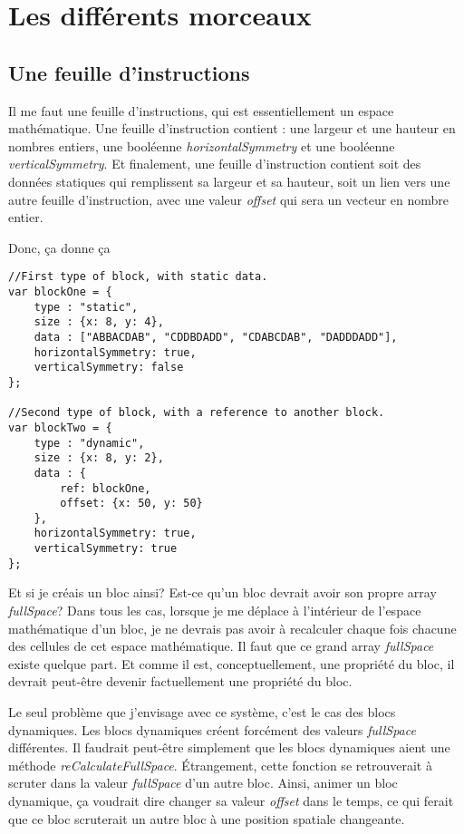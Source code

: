 \section{Les différents morceaux}

\subsection{Une feuille d'instructions}

Il me faut une feuille d'instructions, qui est essentiellement un espace mathématique. Une feuille d'instruction contient : une largeur et une hauteur en nombres entiers, une booléenne \textit{horizontalSymmetry} et une booléenne \textit{verticalSymmetry}. Et finalement, une feuille d'instruction contient soit des données statiques qui remplissent sa largeur et sa hauteur, soit un lien vers une autre feuille d'instruction, avec une valeur \textit{offset} qui sera un vecteur en nombre entier.

Donc, ça donne ça
\begin{lstlisting}
//First type of block, with static data.
var blockOne = {
    type : "static",
    size : {x: 8, y: 4},
    data : ["ABBACDAB", "CDDBDADD", "CDABCDAB", "DADDDADD"],
    horizontalSymmetry: true,
    verticalSymmetry: false
};

//Second type of block, with a reference to another block.
var blockTwo = {
    type : "dynamic",
    size : {x: 8, y: 2},
    data : {
        ref: blockOne,
        offset: {x: 50, y: 50}
    },
    horizontalSymmetry: true,
    verticalSymmetry: true
};
\end{lstlisting}
\newpage
Et si je créais un bloc ainsi? Est-ce qu'un bloc devrait avoir son propre array \textit{fullSpace}? Dans tous les cas, lorsque je me déplace à l'intérieur de l'espace mathématique d'un bloc, je ne devrais pas avoir à recalculer chaque fois chacune des cellules de cet espace mathématique. Il faut que ce grand array \textit{fullSpace} existe quelque part. Et comme il est, conceptuellement, une propriété du bloc, il devrait peut-être devenir factuellement une propriété du bloc. 

Le seul problème que j'envisage avec ce système, c'est le cas des blocs dynamiques. Les blocs dynamiques créent forcément des valeurs \textit{fullSpace} différentes. Il faudrait peut-être simplement que les blocs dynamiques aient une méthode \textit{reCalculateFullSpace}. Étrangement, cette fonction se retrouverait à scruter dans la valeur \textit{fullSpace} d'un autre bloc. Ainsi, animer un bloc dynamique, ça voudrait dire changer sa valeur \textit{offset} dans le temps, ce qui ferait que ce bloc scruterait un autre bloc à une position spatiale changeante.


